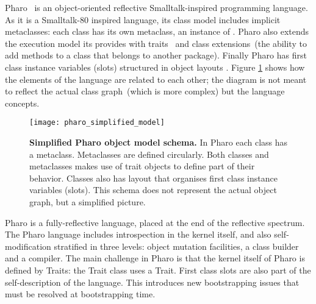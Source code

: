 Pharo~\cite{Blac09a} is an object-oriented reflective Smalltalk-inspired programming language. As it is a Smalltalk-80 inspired language, its class model includes implicit metaclasses: each class has its own metaclass, an instance of . Pharo also extends the execution model its \VM provides with traits~\cite{Scha03a} and class extensions~(\ie the ability to add methods to a class that belongs to another package). Finally Pharo has first class instance variables (slots) structured in object layouts \cite{Verw11a}. Figure \ref{fig:pharo_simplified_model} shows how the elements of the language are related to each other; the diagram is not meant to reflect the actual class graph~(which is more complex) but the language concepts.

\begin{figure}[ht]
\center
\texttt{[image: pharo\_simplified\_model]}
\caption{\textbf{Simplified Pharo object model schema.} In Pharo each class has a metaclass. Metaclasses are defined circularly. Both classes and metaclasses makes use of trait objects to define part of their behavior. Classes also has layout that organises first class instance variables (slots). This schema does not represent the actual object graph, but a simplified picture.\label{fig:pharo_simplified_model}}
\end{figure}

Pharo is a fully-reflective language, placed at the end of the reflective spectrum. The Pharo language includes introspection in the kernel itself, and also self-modification stratified in three levels: object mutation facilities, a class builder and a compiler. The main challenge in Pharo is that the kernel itself of Pharo is defined by Traits: \eg the Trait class uses a Trait. First class slots are also part of the self-description of the language. This introduces new bootstrapping issues that must be resolved at bootstrapping time.




